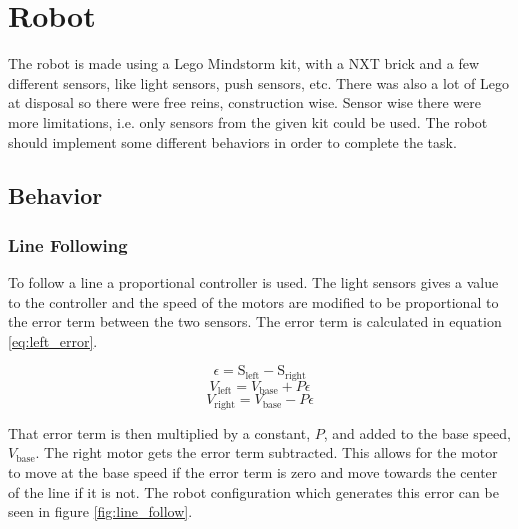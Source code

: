 \section{Robot} 

The robot is made using a Lego Mindstorm kit, with a NXT brick and a few different sensors, like light sensors, push sensors, etc. There was also a lot of Lego at disposal so there were free reins, construction wise. Sensor wise there were more limitations, i.e. only sensors from the given kit could be used. The robot should implement some different behaviors in order to complete the task.

\subsection{Behavior}

\subsubsection{Line Following}

To follow a line a proportional controller is used.
The light sensors gives a value to the controller and the speed of the motors are modified to be proportional to the error term between the two sensors.
The error term is calculated in equation \ref{eq:left_error}.

\begin{equation}
  \epsilon = \text{S}_{\text{left}} - \text{S}_{\text{right}}
 \label{eq:left_error}
\end{equation}
\begin{equation}
  V_\text{left} = V_\text{base} + P \epsilon
 \label{eq:left_speed}
\end{equation}
\begin{equation}
  V_\text{right} = V_\text{base} - P \epsilon
 \label{eq:right_speed}
\end{equation}

That error term is then multiplied by a constant, $P$, and added to the base speed, $V_\text{base}$.
The right motor gets the error term subtracted.
This allows for the motor to move at the base speed if the error term is zero and move towards the center of the line if it is not.
The robot configuration which generates this error can be seen in figure \ref{fig:line_follow}.

